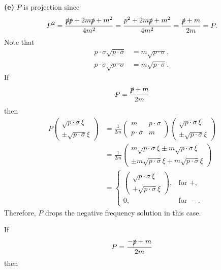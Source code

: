 \documentclass{article}
\makeatletter
\newcommand*{\shifttext}[1]{%
  \settowidth{\@tempdima}{#1}%
  \hspace{-\@tempdima}#1%
}
\newcommand{\plabel}[1]{%
\shifttext{\textbf{#1}\quad}%
}
\makeatother
\begin{document}
\plabel{(e)}%
$P$ is projection since
\[ P^2 = \frac{\slashed{p}\slashed{p} + 2m\slashed{p} + m^2}{4m^2} = \frac{p^2 + 2m\slashed{p} + m^2}{4m^2} = \frac{\slashed{p} + m}{2m} = P. \]
Note that
\begin{align*}
    p\cdot\sigma \sqrt{p\cdot \overline{\sigma}} &= m \sqrt{p\cdot \sigma}, \\
    p\cdot\overline{\sigma} \sqrt{p\cdot \sigma} &= m \sqrt{p\cdot \overline{\sigma}}.
\end{align*}
If
\[ P = \frac{\slashed{p} + m}{2m} \]
then
\begin{align*}
    P \begin{pmatrix}
        \sqrt{p\cdot \sigma} \xi \\ \pm \sqrt{p\cdot \overline{\sigma}}\xi
    \end{pmatrix} &= \frac{1}{2m}\begin{pmatrix}
        m & p\cdot\sigma \\
        p\cdot \overline{\sigma} & m
    \end{pmatrix}\begin{pmatrix}
        \sqrt{p\cdot \sigma} \xi \\ \pm \sqrt{p\cdot \overline{\sigma}}\xi
    \end{pmatrix} \\
    &= \frac{1}{2m} \begin{pmatrix}
        m\sqrt{p\cdot \sigma} \xi \pm m \sqrt{p\cdot \sigma}\xi \\
        \pm m \sqrt{p\cdot \overline{\sigma}}\xi + m\sqrt{p\cdot \overline{\sigma}} \xi
    \end{pmatrix} \\
    &= \begin{cases}
        \begin{pmatrix}
            \sqrt{p\cdot \sigma} \xi \\ +\sqrt{p\cdot \overline{\sigma}}\xi
        \end{pmatrix}, & \text{for } +, \\
        0, & \text{for } -.
    \end{cases}
\end{align*}
Therefore, $P$ drops the negative frequency solution in this case.
\par
If
\[ P = \frac{-\slashed{p}+m}{2m} \]
then
\end{document}

